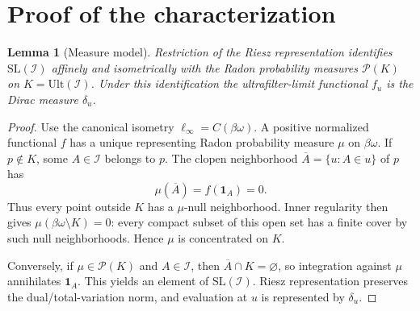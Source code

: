 \documentclass[11pt]{article}
\newtheorem{lemma}[theorem]{Lemma}
\theoremstyle{definition}
\theoremstyle{remark}
\newcommand{\I}{\mathcal I}
\newcommand{\SL}{\mathrm{SL}}
\newcommand{\Ult}{\mathrm{Ult}}
\newcommand{\bN}{\beta\omega}
\newcommand{\one}{\mathbf 1}
\begin{document}
\section{Proof of the characterization}

\begin{lemma}[Measure model]\label{lem:measure}
Restriction of the Riesz representation identifies $\SL(\I)$ affinely and
isometrically with the Radon probability measures $\mathcal P(K)$ on
$K=\Ult(\I)$.  Under this identification the ultrafilter-limit functional
$f_u$ is the Dirac measure $\delta_u$.
\end{lemma}
\begin{proof}
Use the canonical isometry $\ell_\infty=C(\bN)$.  A positive normalized
functional $f$ has a unique representing Radon probability measure $\mu$ on
$\bN$.  If $p\notin K$, some $A\in\I$ belongs to $p$.  The clopen neighborhood
$\overline A=\{u:A\in u\}$ of $p$ has
\[
  \mu(\overline A)=f(\one_A)=0.
\]
Thus every point outside $K$ has a $\mu$-null neighborhood.  Inner regularity
then gives $\mu(\bN\setminus K)=0$: every compact subset of this open set has
a finite cover by such null neighborhoods.  Hence $\mu$ is concentrated on
$K$.

Conversely, if $\mu\in\mathcal P(K)$ and $A\in\I$, then
$\overline A\cap K=\varnothing$, so integration against $\mu$ annihilates
$\one_A$.  This yields an element of $\SL(\I)$.  Riesz representation preserves
the dual/total-variation norm, and evaluation at $u$ is represented by
$\delta_u$.
\end{proof}
\end{document}
